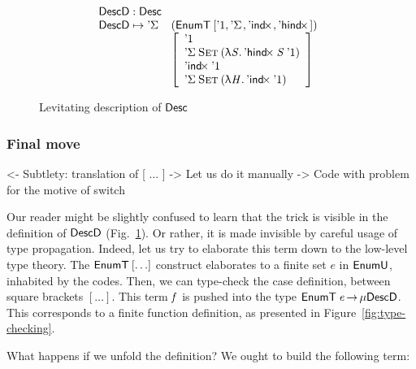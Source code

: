 \begin{figure}

\[\stk{
\DescD : \Desc \\
\begin{array}{@{}ll}
\DescD \mapsto \DSigma{\!}{\!} & (\EnumT{[ \DUnit, \DSigma{\!}{\!}, \DIndx{\!}, \DHindx{\!}{\!} ]}) \\
                           & \left[\begin{array}{l}
                                   \DUnit                                            \\
                                   \DSigma{\Set}{(\LAM{\V{S}} \DHindx{\V{S}}{\DUnit})}   \\
                                   \DIndx{\DUnit}                                    \\
                                   \DSigma{\Set}{(\LAM{\V{H}} \DIndx{\DUnit})}
                                   \end{array}
                             \right]
\end{array}
}\]

\caption{Levitating description of $\Desc$}
\label{fig:desc-levitate}

\end{figure}

\subsubsection{Final move}

\begin{wstructure}
<- Subtlety: translation of [ ... ]
    -> Let us do it manually
        -> Code with problem for the motive of switch
\end{wstructure}

Our reader might be slightly confused to learn that the trick is
visible in the definition of $\DescD$
(Fig.~\ref{fig:desc-levitate}). Or rather, it is made invisible by
careful usage of type propagation. Indeed, let us try to elaborate
this term down to the low-level type theory. The $\EnumT{[ \ldots ]}$
construct elaborates to a finite set $e$ in $\EnumU$, inhabited by the
codes. Then, we can type-check the case definition, between square
brackets $[ \ldots ]$. This term $\V{f}$ is pushed into the type
$\EnumT{\V{e}} \To \Mu{\DescD}$. This corresponds to a finite function
definition, as presented in Figure~\ref{fig:type-checking}.

What happens if we unfold the definition? We ought to build the following term:

